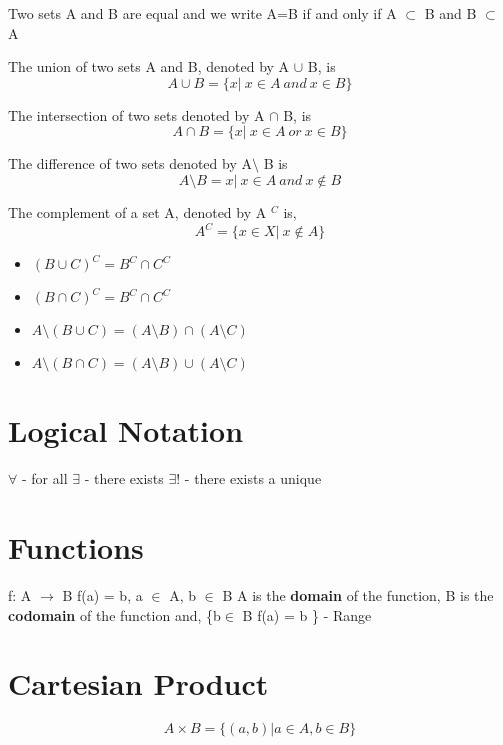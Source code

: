 \documentclass{report}
\begin{document}
\begin{theorem}
    Two sets A and B are equal and we write A=B if and only if A $\subset$ B and B $\subset$ A
\end{theorem}

\begin{definition}[Unions]
    The union of two sets A and B, denoted by A $\cup$ B, is
    \[ A \cup B = \{x|\ x \in A \ and \ x \in B\}\]
\end{definition}
\begin{definition}[Intersections]
    The intersection of two sets denoted by A $\cap$ B, is
    \[A \cap B = \{x|\ x \in A \ or \ x \in B\}\]
\end{definition}
\begin{definition}
    The difference of two sets denoted by A$\setminus$ B is
    \[A\setminus B = {x|\ x \in A \ and \ x \notin B}\]
\end{definition}

\begin{definition}
    The complement of a set A, denoted by A $^{C}$ is,
    \[A^{C} = \{x \in X |\ x \notin A \}\]
\end{definition}
\begin{itemize}
    \item $(B \cup C)^{C} = B^{C}  \cap C^{C}$
    \item $(B \cap C)^{C} = B^{C} \cap C^{C}$
    \item $A\setminus (B\cup C) = (A\setminus B) \cap (A \setminus C)$
    \item $A\setminus (B\cap C) = (A\setminus B) \cup (A \setminus C)$
\end{itemize}
\section{Logical Notation}
$\forall$ - for all
$\exists$ - there exists
$\exists!$ - there exists a unique

\section{Functions}
f: A $\rightarrow$ B
f(a) = b, a $\in$ A, b $\in$ B
A is the \textbf{domain} of the function, B is the \textbf{codomain} of the function and, 
\{b$\in$ B \textbar f(a) = b \} - Range
\section{Cartesian Product}
\[A \times B = \{(a,b) | a \in A, b \in B\}\]
\end{document}
